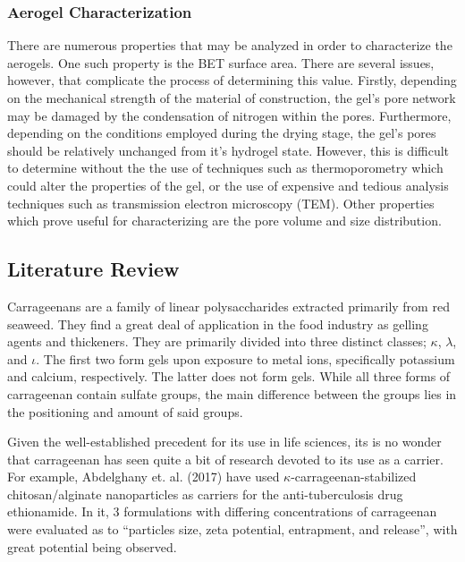 \documentclass[a4paper,12pt]{article}
\begin{document}
\subsubsection{Aerogel Characterization}

There are numerous properties that may be analyzed in order to characterize the aerogels. One such property is the BET surface area. \supercite{campbell_synthesis_1992} There are several issues, however, that complicate the process of determining this value. Firstly, depending on the mechanical strength of the material of construction, the gel's pore network may be damaged by the condensation of nitrogen within the pores. Furthermore, depending on the conditions employed during the drying stage, the gel's pores should be relatively unchanged from it's hydrogel state. However, this is difficult to determine without the the use of techniques such as thermoporometry which could alter the properties of the gel, or the use of expensive and tedious analysis techniques such as transmission electron microscopy (TEM). Other properties which prove useful for characterizing are the pore volume and size distribution. \supercite{scherer_characterization_1998} 



\pagebreak 

\subsection{Literature Review}

Carrageenans are a family of linear polysaccharides extracted primarily from red seaweed. They find a great deal of application in the food industry as gelling agents and thickeners. They are primarily divided into three distinct classes; $\kappa$, $\lambda$, and $\iota$.\supercite{stanley_chapter_nodate} The first two form gels upon exposure to metal ions, specifically potassium and calcium, respectively. The latter does not form gels. While all three forms of carrageenan contain sulfate groups, the main difference between the groups lies in the positioning and amount of said groups.\supercite{garcia-gonzalez_polysaccharide-based_2011}

Given the well-established precedent for its use in life sciences, its is no wonder that carrageenan has seen quite a bit of research devoted to its use as a carrier. For example, Abdelghany et. al. (2017) have used $\kappa$-carrageenan-stabilized chitosan/alginate nanoparticles as carriers for the anti-tuberculosis drug ethionamide. In it, 3 formulations with differing concentrations of carrageenan were evaluated as to “particles size, zeta potential, entrapment, and release”, with great potential being observed.\supercite{abdelghany_carrageenan-stabilized_2017}
\end{document}
